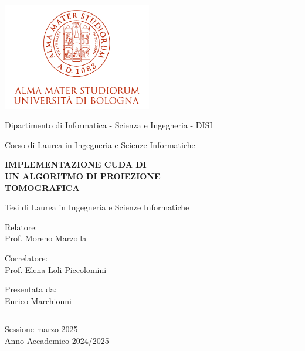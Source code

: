 \documentclass[12pt,a4paper]{report}
\begin{document}
\begin{titlepage}

\begin{center}

\includegraphics[width=6.5cm,height=4.7cm]{marchio-di-ateneo}

\vspace{10mm}

{Dipartimento di Informatica - Scienza e Ingegneria - DISI} 

\vspace{5mm}

{\large{Corso di Laurea in Ingegneria e Scienze Informatiche}}

\vspace{15mm}

{\huge{\bf{IMPLEMENTAZIONE CUDA DI}}}\\
\vspace{3mm}
{\huge{\bf{UN ALGORITMO DI PROIEZIONE}}}\\
\vspace{3mm}
{\huge{\bf{TOMOGRAFICA}}}\\
\vspace{3mm}

\vspace{5mm}
{Tesi di Laurea in Ingegneria e Scienze Informatiche}

\end{center}

\vspace{10mm}

\noindent\begin{minipage}[t]{0.40\textwidth}
{\large{Relatore: \\ Prof. Moreno Marzolla}}

\vspace{3mm}

{\large{Correlatore: \\ Prof. Elena Loli Piccolomini}}
\end{minipage}
\hfill
\begin{minipage}[t]{0.40\textwidth}\raggedleft
{\large{Presentata da: \\ Enrico Marchionni}}
\end{minipage}

\vfill

\hrule height 0.6mm

\begin{center}
{Sessione marzo 2025\\}
{Anno Accademico 2024/2025\\}
\end{center}

\end{titlepage}
\end{document}
